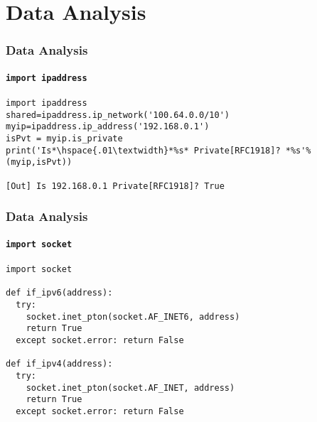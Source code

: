 \section{Data Analysis}





\begin{frame}[fragile]
  \frametitle{Data Analysis}
  \framesubtitle{\texttt{import ipaddress}}
    \begin{lstlisting}
import ipaddress
shared=ipaddress.ip_network('100.64.0.0/10')
myip=ipaddress.ip_address('192.168.0.1') 
isPvt = myip.is_private
print('Is*\hspace{.01\textwidth}*%s* Private[RFC1918]? *%s'%(myip,isPvt))

[Out] Is 192.168.0.1 Private[RFC1918]? True

    \end{lstlisting}
\end{frame}

\begin{frame}[fragile]
  \frametitle{Data Analysis}
  \framesubtitle{\texttt{import socket}}
    \begin{lstlisting}
import socket

def if_ipv6(address):
  try:
    socket.inet_pton(socket.AF_INET6, address)
    return True
  except socket.error: return False

def if_ipv4(address):
  try:
    socket.inet_pton(socket.AF_INET, address)
    return True
  except socket.error: return False
    \end{lstlisting}
\end{frame}

